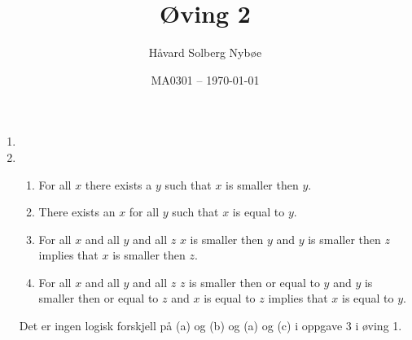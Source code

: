 \documentclass[a4paper, 12pt]{article}  %
\title{Øving 2}                         %
\author{Håvard Solberg Nybøe}           %
\date{MA0301 -- \today}                 %
\begin{document}
\maketitle

\begin{enumerate}
    \item [\boxed{1}] 
    \item [\boxed{2}] \begin{enumerate}
        \item For all $x$ there exists a $y$ such that $x$ is smaller then $y$.
        \item There exists an $x$ for all $y$ such that $x$ is equal to $y$.
        \item For all $x$ and all $y$ and all $z$ $x$ is smaller then $y$ and $y$ is smaller then $z$ implies that $x$ is smaller then $z$.
        \item For all $x$ and all $y$ and all $z$ $z$ is smaller then or equal to $y$ and $y$ is smaller then or equal to $z$ and $x$ is equal to $z$ implies that $x$ is equal to $y$.
    \end{enumerate}
    Det er ingen logisk forskjell på (a) og (b) og (a) og (c) i oppgave 3 i øving 1.
\end{enumerate}

\end{document}
